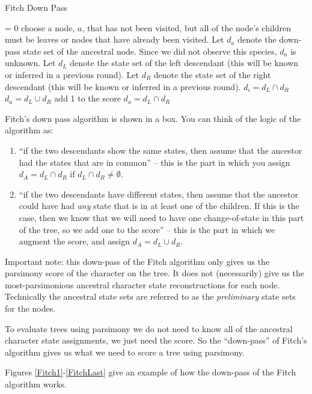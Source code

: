 \documentclass[11pt]{article}
\begin{document}
\begin{algorithm} 
\caption{Fitch Down Pass}
\begin{algorithmic}[1]
	 = 0
	 	 \STATE choose a node, $a$, that has not been visited, but all of the node's children must be  leaves or nodes that have already been visited.
		 \STATE Let $d_a$ denote the down-pass state set of the ancestral node.  Since we did not observe this species, $d_a$ is unknown.
		 \STATE Let $d_L$ denote the state set of the left descendant (this will be known or inferred in a previous round).
		 \STATE Let $d_R$ denote the state set of the right descendant (this will be known or inferred in a previous round).
		 \STATE $d_i = d_L\cap d_R$ 
		 	\STATE $d_a = d_L\cup d_R$
			\STATE add 1 to the {\sf score}
		 \ELSE
		 	\STATE $d_a = d_L\cap d_R$
		 \ENDIF
	\ENDWHILE
\end{algorithmic}
\end{algorithm} 

Fitch's down pass algorithm is shown in a box. You can think of the logic of the algorithm as: 
\begin{enumerate}
	\item ``if the two descendants show the same states, then assume that the ancestor had the states that are in common'' -- this is the part in which you assign $d_A = d_L\cap d_R$ if $d_L\cap d_R \neq \emptyset$.
	\item ``if the two descendants have different states, then assume that the ancestor could have had {\em any} state that is in at least one of the children.  If this is the case, then we know that we will need to have one change-of-state in this part of the tree, so we add one to the score'' -- this is the part in which we augment the score, and assign $d_A = d_L\cup d_R$.
\end{enumerate}
Important note: this down-pass of the Fitch algorithm only gives us the parsimony score of the character on the tree.  It does not (necessarily) give us the most-parsimonious ancestral character state reconstructions for each node.  Technically the ancestral state sets are referred to as the {\em preliminary} state sets for the nodes. 

To evaluate trees using parsimony we do not need to know all of the ancestral character state assignments, we just need the score. So the ``down-pass'' of Fitch's algorithm gives us what we need to score a tree using parsimony.

Figures \ref{Fitch1}-\ref{FitchLast} give an example of how the down-pass of the Fitch algorithm works.
\end{document}
